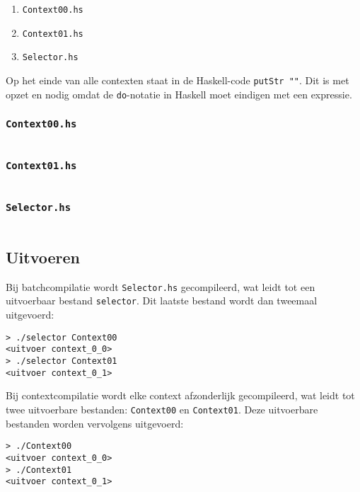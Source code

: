 \begin{enumerate}
    \item \texttt{Context00.hs}
    \item \texttt{Context01.hs}
    \item \texttt{Selector.hs}
\end{enumerate}

Op het einde van alle contexten staat in de Haskell-code \texttt{putStr ""}.
Dit is met opzet en nodig omdat de \texttt{do}-notatie in Haskell moet eindigen met een expressie.

\subsubsection{\texttt{Context00.hs}}

\inputminted{haskell}{sources/echo/Context00.hs}

\subsubsection{\texttt{Context01.hs}}

\inputminted{haskell}{sources/echo/Context01.hs}

\subsubsection{\texttt{Selector.hs}}

\inputminted{haskell}{sources/echo/Selector.hs}

\subsection{Uitvoeren}\label{subsec:echo-haskell-uitvoeren}

Bij batchcompilatie wordt \texttt{Selector.hs} gecompileerd, wat leidt tot een uitvoerbaar bestand \texttt{selector}.
Dit laatste bestand wordt dan tweemaal uitgevoerd:

\begin{verbatim}
> ./selector Context00
<uitvoer context_0_0>
> ./selector Context01
<uitvoer context_0_1>
\end{verbatim}

Bij contextcompilatie wordt elke context afzonderlijk gecompileerd, wat leidt tot twee uitvoerbare bestanden: \texttt{Context00} en \texttt{Context01}.
Deze uitvoerbare bestanden worden vervolgens uitgevoerd:

\begin{verbatim}
> ./Context00
<uitvoer context_0_0>
> ./Context01
<uitvoer context_0_1>
\end{verbatim}
